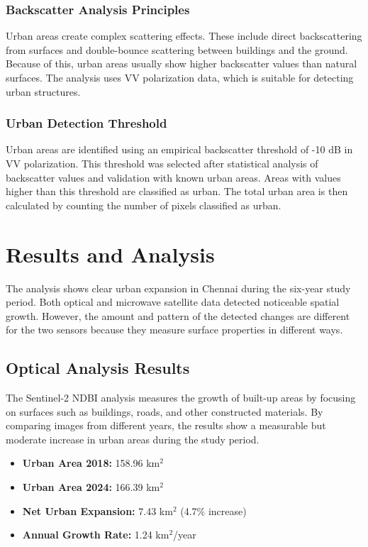 \documentclass[conference]{IEEEtran}
\begin{document}
\subsubsection{Backscatter Analysis Principles}
Urban areas create complex scattering effects. These include direct backscattering from surfaces and double-bounce scattering between buildings and the ground. Because of this, urban areas usually show higher backscatter values than natural surfaces. The analysis uses VV polarization data, which is suitable for detecting urban structures.

\subsubsection{Urban Detection Threshold}
Urban areas are identified using an empirical backscatter threshold of -10 dB in VV polarization. This threshold was selected after statistical analysis of backscatter values and validation with known urban areas. Areas with values higher than this threshold are classified as urban. The total urban area is then calculated by counting the number of pixels classified as urban.

\section{Results and Analysis}

The analysis shows clear urban expansion in Chennai during the six-year study period. Both optical and microwave satellite data detected noticeable spatial growth. However, the amount and pattern of the detected changes are different for the two sensors because they measure surface properties in different ways.

\subsection{Optical Analysis Results}

The Sentinel-2 NDBI analysis measures the growth of built-up areas by focusing on surfaces such as buildings, roads, and other constructed materials. By comparing images from different years, the results show a measurable but moderate increase in urban areas during the study period.

\begin{itemize}
    \item \textbf{Urban Area 2018:} 158.96 km$^2$
    \item \textbf{Urban Area 2024:} 166.39 km$^2$
    \item \textbf{Net Urban Expansion:} 7.43 km$^2$ (4.7\% increase)
    \item \textbf{Annual Growth Rate:} 1.24 km$^2$/year
\end{itemize}
\end{document}
